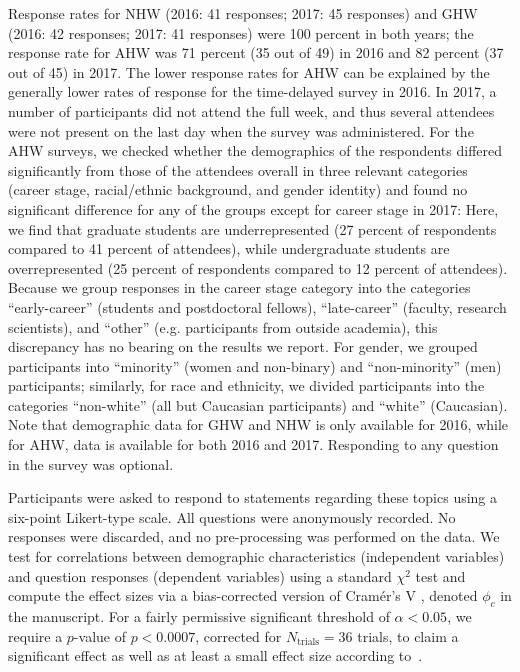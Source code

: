 \documentclass{aastex62}
\begin{document}
Response rates for NHW (2016: 41 responses; 2017: 45 responses) and GHW (2016: 42 responses; 2017: 41 responses) were 100 percent in both years; the response rate for AHW was 71 percent (35 out of 49) in 2016 and 82 percent (37 out of 45) in 2017. The lower response rates for AHW can be explained by the generally lower rates of response for the time-delayed survey in 2016. In 2017, a number of participants did not attend the full week, and thus several attendees were not present on the last day when the survey was administered. For the AHW surveys, we checked whether the demographics of the respondents diﬀered signiﬁcantly from those of the attendees overall in three relevant categories (career stage, racial/ethnic background, and gender identity) and found no signiﬁcant diﬀerence for any of the groups except for career stage in 2017: Here, we ﬁnd that graduate students are underrepresented (27 percent of respondents compared to 41 percent of attendees), while undergraduate students are overrepresented (25 percent of respondents compared to 12 percent of attendees). Because we group responses in the career stage category into the categories “early-career” (students and postdoctoral fellows), “late-career” (faculty, research scientists), and “other” (e.g. participants from outside academia), this discrepancy has no bearing on the results we report. For gender, we grouped participants into “minority” (women and non-binary) and “non-minority” (men) participants; similarly, for race and ethnicity, we divided participants into the categories “non-white” (all but Caucasian participants) and “white” (Caucasian). Note that demographic data for GHW and NHW is only available for 2016, while for AHW, data is available for both 2016 and 2017. Responding to any question in the survey was optional.

Participants were asked to respond to statements regarding these topics using a six-point Likert-type scale. All questions were anonymously recorded. No responses were discarded, and no pre-processing was performed on the data. We test for correlations between demographic characteristics (independent variables) and question responses (dependent variables) using a standard $\chi^2$ test and compute the effect sizes via a bias-corrected version of Cram\'{e}r's V \citep{cramer1946,bergsma2013}, denoted $\phi_c$ in the manuscript. For a fairly permissive significant threshold of $\alpha < 0.05$, we require a $p$-value of $p < 0.0007$, corrected for $N_\mathrm{trials} = 36$ trials, to claim a significant effect as well as at least a small effect size according to~\citep{cohen1988}.
\end{document}

